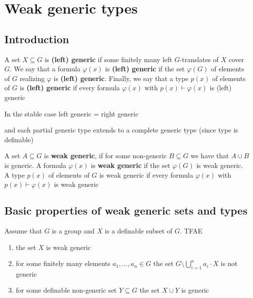 \documentclass[11pt]{article}
\begin{document}
\section{Weak generic types}
\label{sec:org9289734}
\subsection{Introduction}
\label{sec:orga17b735}
\begin{definition}
A set \(X\subseteq G\) is \textbf{(left) generic} if some finitely many left \(G\)-translates of \(X\)
cover \(G\). We say that a formula \(\varphi(x)\) is \textbf{(left) generic} if the set \(\varphi(G)\) of elements
of \(G\) realizing \(\varphi\) is \textbf{(left) generic}. Finally, we say that a type \(p(x)\) of elements
of \(G\) is \textbf{(left) generic} if every formula \(\varphi(x)\) with \(p(x)\vdash\varphi(x)\) is (left) generic
\end{definition}

In the stable case left generic = right generic \label{Problem1}

and each partial generic type extends to a complete generic type (since type is definable)

\begin{definition}[]
A set \(A\subseteq G\) is \textbf{weak generic}, if for some non-generic \(B\subseteq G\) we have that \(A\cup B\) is
generic. A formula \(\varphi(x)\) is \textbf{weak generic} if the set \(\varphi(G)\) is weak generic. A type \(p(x)\)
of elements of \(G\) is weak generic if every formula \(\varphi(x)\) with \(p(x)\vdash\varphi(x)\) is weak generic
\end{definition}

\subsection{Basic properties of weak generic sets and types}
\label{sec:org2e6d678}
\begin{lemma}[]
\label{3.2.1}
Assume that \(G\) is a group and \(X\) is a definable subset of \(G\). TFAE
\begin{enumerate}
\item the set \(X\) is weak generic
\item for some finitely many elements \(a_1,\dots,a_n\in G\) the set \(G\setminus\bigcup_{i=1}^na_i\cdot X\) is not generic
\item for some definable non-generic set \(Y\subseteq G\) the set \(X\cup Y\) is generic
\end{enumerate}
\end{lemma}
\end{document}
